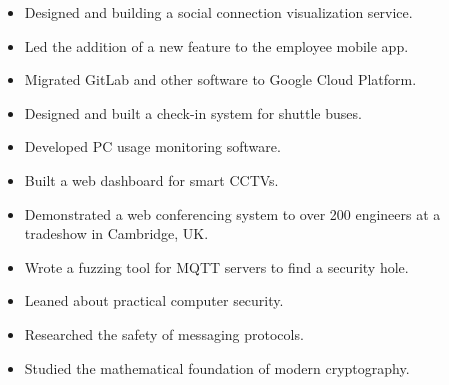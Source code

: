 \documentclass[10pt,a4paper,ragged2e,withhyper]{altacv}
\begin{document}
\begin{paracol}{2}


\begin{itemize}
\item
  Designed and building a social connection visualization service.

\item 
  Led the addition of a new feature to the employee mobile app.

\item
  Migrated GitLab and other software to Google Cloud Platform.

\item
  Designed and built a check-in system for shuttle buses.

\item 
  Developed PC usage monitoring software.

\item
  Built a web dashboard for smart CCTVs.

\item
  Demonstrated a web conferencing system to over 200 engineers at a tradeshow in Cambridge, UK.

\end{itemize}

\divider


\begin{itemize}
  \item Wrote a fuzzing tool for MQTT servers to find a security hole.
  \item Leaned about practical computer security.
\end{itemize}



\begin{itemize}
  \item Researched the safety of messaging protocols.
  \item Studied the mathematical foundation of modern cryptography.
\end{itemize}


\end{paracol}
\end{document}
